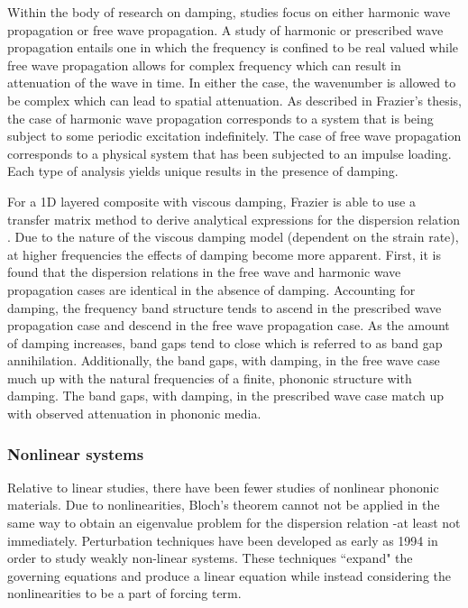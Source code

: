 \documentclass{article}
\begin{document}
Within the body of research on damping, studies focus on either harmonic wave 
propagation or free wave propagation. A study of harmonic or prescribed wave 
propagation entails one in which the frequency is confined to be real valued 
while free wave propagation allows for complex frequency which can result in 
attenuation of the wave in time. In either the case, the wavenumber is allowed 
to be complex which can lead to spatial attenuation. As described in Frazier's 
thesis, the case of harmonic wave propagation corresponds to a system that is 
being subject to some periodic excitation indefinitely. The case of free wave 
propagation corresponds to a physical system that has been subjected to an 
impulse loading. Each type of analysis yields unique results in the presence of 
damping. 

For a 1D layered composite with viscous damping, Frazier is able to use a 
transfer matrix method to derive analytical expressions for the dispersion 
relation \cite{frazier15}. Due to the nature of the viscous damping model 
(dependent on the 
strain rate), at higher frequencies the effects of damping become more 
apparent. First, it is found that the dispersion relations in the free wave and 
harmonic wave propagation cases are identical in the absence of damping. 
Accounting for damping, the frequency band structure tends to ascend in the 
prescribed wave propagation case and descend in the free wave propagation case. 
As the amount of damping increases, band gaps tend to close which is referred 
to as band gap annihilation. Additionally, the band gaps, with damping, in the 
free wave case much up with the natural frequencies of a finite, phononic 
structure with damping. The band gaps, with damping, in the prescribed wave 
case match up with observed attenuation in phononic media. 

\subsubsection{Nonlinear systems}
Relative to linear studies, there have been fewer studies of nonlinear phononic 
materials. Due to nonlinearities, Bloch's theorem cannot not be applied in the 
same way to obtain an eigenvalue problem for the dispersion relation -at least 
not immediately. Perturbation techniques have been developed as early as 1994 
in order to study weakly non-linear systems. These techniques ``expand" the 
governing equations and produce a linear equation while instead considering the 
nonlinearities to be a part of forcing term.
\end{document}
